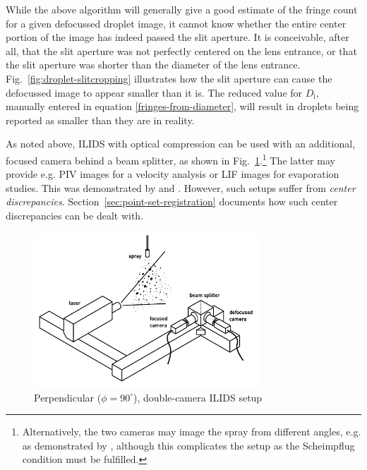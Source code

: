 \documentclass[11.5pt]{book}
\newcommand*{\figref}[1]{Fig.~\ref{#1}}
\newcommand*{\secref}[1]{Section~\ref{#1}}
\begin{document}
While the above algorithm will generally give a good estimate of the fringe
count for a given defocussed droplet image, it cannot know whether the entire
center portion of the image has indeed passed the slit aperture. It is
conceivable, after all, that the slit aperture was not perfectly centered on the
lens entrance, or that the slit aperture was shorter than the diameter of the
lens entrance. \figref{fig:droplet-slitcropping} illustrates how the slit
aperture can cause the defocussed image to appear smaller than it is. The
reduced value for $D_\text{i}$, manually entered in equation
\eqref{fringes-from-diameter}, will result
in droplets being reported as smaller than they are in reality.

As noted above, ILIDS with optical compression can be used with an additional,
focused camera behind a beam splitter, as shown in
\figref{fig:ipi-setup-double}.\footnote{Alternatively, the two cameras may image
    the spray from different angles, e.g. as demonstrated by \citet{Glover95},
    although this complicates the setup as the Scheimpflug condition must be
fulfilled.} The latter may provide e.g. PIV images for a
velocity analysis or LIF images for evaporation studies. This was demonstrated
by \citet{Hardalupas10} and \citet{Hardalupas10a}. However, such setups suffer
from \emph{center discrepancies}. \secref{sec:point-set-registration} documents
how such center discrepancies can be dealt with.

\begin{figure}
\centering
\includegraphics[width=0.75\textwidth]{img/setup/ipi_setup_double.pdf}
\caption{Perpendicular ($\phi=90^\circ$), double-camera ILIDS setup}
\label{fig:ipi-setup-double}
\end{figure}
\end{document}
